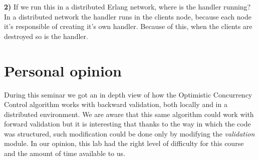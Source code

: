 \documentclass[a4paper, 11pt]{article}
\begin{document}
%
\textbf{2)} If we run this in a distributed Erlang network, where is the handler running?\\

In a distributed network the handler runs in the clients node, because each node it's responsible of creating it's own handler. Because of this, when the clients are destroyed so is the handler.\\

\section{Personal opinion}
During this seminar we got an in depth view of how the Optimistic Concurrency Control algorithm works with backward validation, both locally and in a distributed environment. We are aware that this same algorithm could work with forward validation but it is interesting that thanks to the way in which the code was structured, such modification could be done only by modifying the \textit{validation} module. In our opinion, this lab had the right level of difficulty for this course and the amount of time available to us. \\
\end{document}
